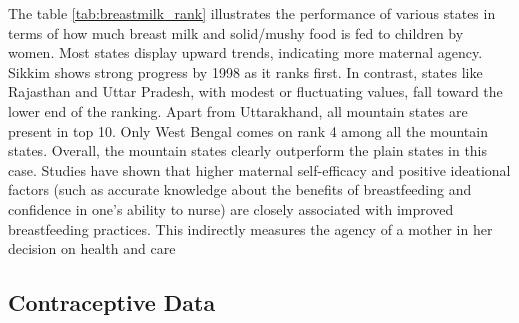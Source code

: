 The table \ref{tab:breastmilk_rank} illustrates the performance of various states in terms of how much breast milk and solid/mushy food is fed to children by women. Most states display  upward trends, indicating more maternal agency. Sikkim shows strong progress by 1998 as it ranks first. In contrast, states like Rajasthan and Uttar Pradesh, with modest or fluctuating values, fall toward the lower end of the ranking. Apart from Uttarakhand, all mountain states are present in top 10. Only West Bengal comes on rank 4 among all the mountain states. Overall, the mountain states clearly outperform the plain states in this case. Studies have shown that higher maternal self-efficacy and positive ideational factors (such as accurate knowledge about the benefits of breastfeeding and confidence in one’s ability to nurse) are closely associated with improved breastfeeding practices. This indirectly measures the agency of a mother in her decision on health and care \citep{Hutchinson_2022}
\subsection{Contraceptive Data}

